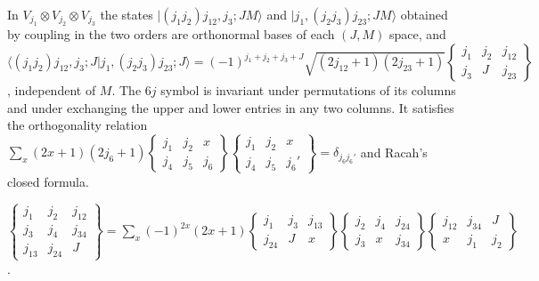 \begin{theorem}\label{thm:6j}
  In $V_{j_1}\otimes V_{j_2}\otimes V_{j_3}$ the states $|(j_1j_2)j_{12},j_3;JM\rangle$ and $|j_1,(j_2j_3)j_{23};JM\rangle$ obtained by
  coupling in the two orders are orthonormal bases of each $(J,M)$ space, and
  $\langle(j_1j_2)j_{12},j_3;J|j_1,(j_2j_3)j_{23};J\rangle=(-1)^{j_1+j_2+j_3+J}\sqrt{(2j_{12}+1)(2j_{23}+1)}
  \begin{Bmatrix}j_1&j_2&j_{12}\\j_3&J&j_{23}\end{Bmatrix}$, independent of $M$. The $6j$ symbol is invariant under
  permutations of its columns and under exchanging the upper and lower entries in any two columns. It satisfies the
  orthogonality relation $\sum_{x}(2x+1)(2j_6+1)\begin{Bmatrix}j_1&j_2&x\\j_4&j_5&j_6\end{Bmatrix}
  \begin{Bmatrix}j_1&j_2&x\\j_4&j_5&j_6'\end{Bmatrix}=\delta_{j_6j_6'}$ and Racah's closed formula.
\end{theorem}

\begin{definition}\label{def:9j}
  \leanok
  $\begin{Bmatrix}j_1&j_2&j_{12}\\j_3&j_4&j_{34}\\j_{13}&j_{24}&J\end{Bmatrix}=\sum_x(-1)^{2x}(2x+1)
  \begin{Bmatrix}j_1&j_3&j_{13}\\j_{24}&J&x\end{Bmatrix}\begin{Bmatrix}j_2&j_4&j_{24}\\j_3&x&j_{34}\end{Bmatrix}
  \begin{Bmatrix}j_{12}&j_{34}&J\\x&j_1&j_2\end{Bmatrix}$.
\end{definition}

